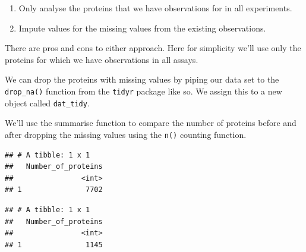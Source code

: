 \documentclass[12pt,]{book}
\newenvironment{Shaded}{\begin{snugshade}}{\end{snugshade}}
\newcommand{\KeywordTok}[1]{\textcolor[rgb]{0.13,0.29,0.53}{\textbf{#1}}}
\newcommand{\DataTypeTok}[1]{\textcolor[rgb]{0.13,0.29,0.53}{#1}}
\newcommand{\StringTok}[1]{\textcolor[rgb]{0.31,0.60,0.02}{#1}}
\newcommand{\CommentTok}[1]{\textcolor[rgb]{0.56,0.35,0.01}{\textit{#1}}}
\newcommand{\OperatorTok}[1]{\textcolor[rgb]{0.81,0.36,0.00}{\textbf{#1}}}
\newcommand{\NormalTok}[1]{#1}
\providecommand{\tightlist}{%
  \setlength{\itemsep}{0pt}\setlength{\parskip}{0pt}}
\theoremstyle{definition}
\theoremstyle{definition}
\theoremstyle{definition}
\theoremstyle{remark}
\begin{document}
\begin{enumerate}
\def\labelenumi{\arabic{enumi}.}
\tightlist
\item
  Only analyse the proteins that we have observations for in all
  experiments.
\item
  Impute values for the missing values from the existing observations.
\end{enumerate}

There are pros and cons to either approach. Here for simplicity we'll
use only the proteins for which we have observations in all assays.

We can drop the proteins with missing values by piping our data set to
the \texttt{drop\_na()} function from the \texttt{tidyr} package like
so. We assign this to a new object called \texttt{dat\_tidy}.

We'll use the summarise function to compare the number of proteins
before and after dropping the missing values using the \texttt{n()}
counting function.

\begin{Shaded}
\end{Shaded}

\begin{verbatim}
## # A tibble: 1 x 1
##   Number_of_proteins
##                <int>
## 1               7702
\end{verbatim}

\begin{Shaded}
\end{Shaded}

\begin{verbatim}
## # A tibble: 1 x 1
##   Number_of_proteins
##                <int>
## 1               1145
\end{verbatim}
\end{document}
